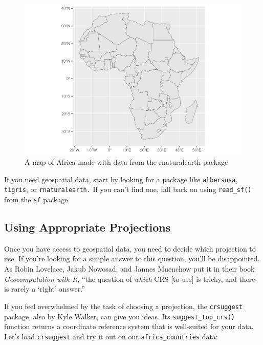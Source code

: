 \documentclass[
]{book}
\begin{document}
\begin{figure}
\includegraphics[width=1\linewidth]{maps_files/figure-latex/africa-map-1} \caption{A map of Africa made with data from the rnaturalearth package}\label{fig:africa-map}
\end{figure}

If you need geospatial data, start by looking for a package like \texttt{albersusa}, \texttt{tigris}, or \texttt{rnaturalearth.} If you can't find one, fall back on using \texttt{read\_sf()} from the \texttt{sf} package.

\hypertarget{using-appropriate-projections}{%
\subsection*{Using Appropriate Projections}\label{using-appropriate-projections}}

Once you have access to geospatial data, you need to decide which projection to use. If you're looking for a simple answer to this question, you'll be disappointed. As Robin Lovelace, Jakub Nowosad, and Jannes Muenchow put it in their book \emph{Geocomputation with R}, ``the question of \emph{which} CRS {[}to use{]} is tricky, and there is rarely a `right' answer.''

If you feel overwhelmed by the task of choosing a projection, the \texttt{crsuggest} package, also by Kyle Walker, can give you ideas. Its \texttt{suggest\_top\_crs()} function returns a coordinate reference system that is well-suited for your data. Let's load \texttt{crsuggest} and try it out on our \texttt{africa\_countries} data:
\end{document}
